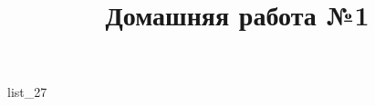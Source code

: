 \documentclass[12pt, a4paper]{article}
\begin{document}
	 \cfoot{} \showanswers
	\title{Домашняя работа №1}
	{list_27}
\end{document}
